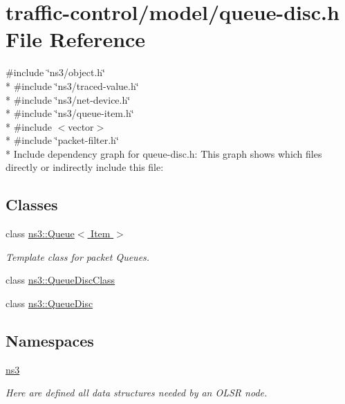 \hypertarget{queue-disc_8h}{}\section{traffic-\/control/model/queue-\/disc.h File Reference}
\label{queue-disc_8h}
{\ttfamily \#include \char`\"{}ns3/object.\+h\char`\"{}}\\*
{\ttfamily \#include \char`\"{}ns3/traced-\/value.\+h\char`\"{}}\\*
{\ttfamily \#include \char`\"{}ns3/net-\/device.\+h\char`\"{}}\\*
{\ttfamily \#include \char`\"{}ns3/queue-\/item.\+h\char`\"{}}\\*
{\ttfamily \#include $<$vector$>$}\\*
{\ttfamily \#include \char`\"{}packet-\/filter.\+h\char`\"{}}\\*
Include dependency graph for queue-\/disc.h\+:
This graph shows which files directly or indirectly include this file\+:
\subsection*{Classes}
\begin{DoxyCompactItemize}
\item 
class \hyperlink{classns3_1_1Queue}{ns3\+::\+Queue$<$ Item $>$}
\begin{DoxyCompactList}\small\item\em Template class for packet Queues. \end{DoxyCompactList}\item 
class \hyperlink{classns3_1_1QueueDiscClass}{ns3\+::\+Queue\+Disc\+Class}
\item 
class \hyperlink{classns3_1_1QueueDisc}{ns3\+::\+Queue\+Disc}
\end{DoxyCompactItemize}
\subsection*{Namespaces}
\begin{DoxyCompactItemize}
\item 
 \hyperlink{namespacens3}{ns3}
\begin{DoxyCompactList}\small\item\em Here are defined all data structures needed by an O\+L\+SR node. \end{DoxyCompactList}\end{DoxyCompactItemize}
